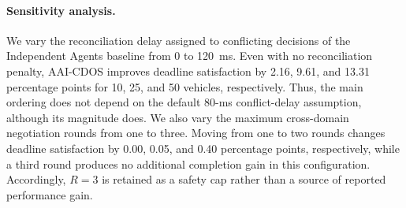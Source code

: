 \paragraph{Sensitivity analysis.}
We vary the reconciliation delay assigned to conflicting decisions of the
Independent Agents baseline from 0 to 120~ms. Even with no reconciliation
penalty, AAI-CDOS improves deadline satisfaction by 2.16, 9.61, and 13.31
percentage points for 10, 25, and 50 vehicles, respectively. Thus, the main
ordering does not depend on the default 80-ms conflict-delay assumption,
although its magnitude does. We also vary the maximum cross-domain negotiation
rounds from one to three. Moving from one to two rounds changes deadline
satisfaction by 0.00, 0.05, and 0.40 percentage points, respectively, while a
third round produces no additional completion gain in this configuration.
Accordingly, $R=3$ is retained as a safety cap rather than a source of reported
performance gain.
